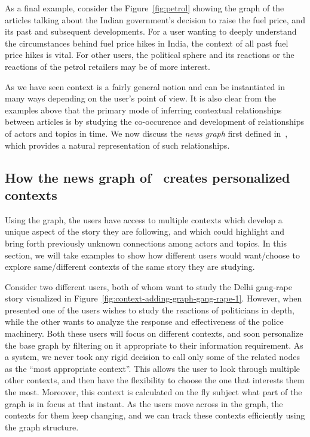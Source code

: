As a final example, consider the Figure~\ref{fig:petrol} showing the graph of the articles talking
about the Indian government's decision to raise the fuel price, and its past and subsequent developments. 
For a user wanting to deeply understand the circumstances behind fuel price hikes in India, the context of 
all past fuel price hikes is vital. For other users, the political
sphere and its reactions or the reactions of the petrol retailers may be of more interest.

As we have seen context is a fairly general notion and can be
instantiated in many ways depending on the user's point of view. It is
also clear from the examples above that the primary mode of inferring
contextual relationships between articles is by studying the
co-occurence and development of relationships of actors and topics in
time. We now discuss the {\em news graph} first defined
in~\cite{choudhary@ecir2008}, which provides a natural representation
of such relationships.


\subsection{How the news graph of~\cite{choudhary@ecir2008} creates personalized contexts}
Using the graph, the users have access to multiple contexts which
develop a unique aspect of the story they are following, and which
could highlight and bring forth previously unknown connections among
actors and topics. In this section, we will take examples to show how
different users would want/choose to explore same/different contexts
of the same story they are studying.

Consider two different users, both of whom want to study the Delhi gang-rape story visualized in Figure~\ref{fig:context-adding-graph-gang-rape-1}. However, when presented
one of the users wishes to study the reactions of politicians in depth, while the other wants to analyze the response and effectiveness of the police
machinery. Both these users will focus on different contexts, and soon personalize the base graph by filtering on it appropriate to their information
requirement. As a system, we never took any rigid decision to call only some of the related nodes as the ``most appropriate context''. This allows
the user to look through multiple other contexts, and then have the flexibility to choose the one that interests them the most. Moreover, this context
is calculated on the fly subject what part of the graph is in focus at that instant. As the users move across in the graph, the contexts for them keep
changing, and we can track these contexts efficiently using the graph structure.


